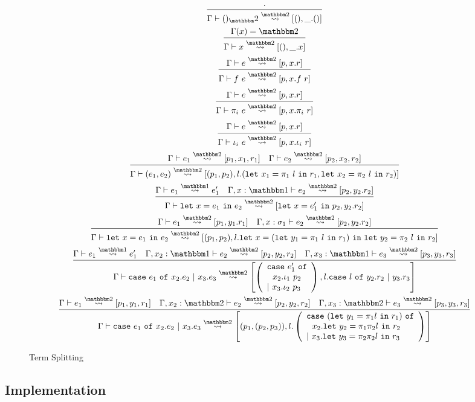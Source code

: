 \documentclass[11pt]{article}
\newcommand {\bbone} {\mathbbm 1}
\newcommand {\bbtwo} {\mathbbm 2}
\newcommand {\letin} [3] {{\tt let}~{#1} = {#2}~{\tt in}~{#3}}
\newcommand {\caseof} [3] {{\tt case}~{#1} ~{\tt of}~{#2}~{\tt |}~{#3}}
\newcommand {\tallcase} [3] {\begin{array}{l} {\tt case}~{#1} ~{\tt of}\\~~{#2}\\{\tt |}~{#3} \end{array}}
\newcommand {\translates} {\overset{\bbone}\rightsquigarrow}
\newcommand {\splits} {\overset{\bbtwo}\rightsquigarrow}
\newcommand {\inferenceSpacing}{\setlength{\jot}{1.8ex}}
\begin{document}
\begin{figure*}
\caption{Term Splitting}
\label{fig:splitting}
\inferenceSpacing
\begin{gather}
\infer {\Gamma \vdash ()_\bbtwo \splits [(),\_.()]}{\cdot} \\
\infer {\Gamma\vdash x \splits [(),\_.x]}{\Gamma(x) = \bbtwo}\\
\infer {\Gamma \vdash f~e \splits [p,x.f~r]}{\Gamma \vdash e \splits [p,x.r]} \\
\infer {\Gamma \vdash \pi_i~e \splits [p,x.\pi_i~r]}{\Gamma \vdash e \splits [p,x.r]} \\
\infer {\Gamma \vdash \iota_i~e \splits [p,x.\iota_i~r]}{\Gamma \vdash e \splits [p,x.r]} \\
\infer {\Gamma \vdash (e_1,e_2) \splits [(p_1,p_2), l.(\letin{x_1}{\pi_1~l}{r_1},\letin{x_2}{\pi_2~l}{r_2})]}{\Gamma \vdash e_1 \splits [p_1,x_1,r_1] & \Gamma \vdash e_2 \splits [p_2,x_2,r_2]} \\
\infer {\Gamma\vdash \letin {x}{e_1}{e_2} \splits [\letin {x}{e'_1}{p_2}, y_2.r_2] }{\Gamma\vdash e_1 \translates e_1' & \Gamma, x:\bbone \vdash e_2 \splits [p_2,y_2.r_2]} \\
\infer { \Gamma\vdash \letin {x}{e_1}{e_2}  \splits [(p_1,p_2), l.\letin {x}{(\letin {y_1}{\pi_1~l}{r_1})}{\letin {y_2}{\pi_2~l}{r_2}}] }{\Gamma\vdash e_1 \splits [p_1,y_1.r_1] & \Gamma, x:\sigma_1 \vdash e_2 \splits [p_2,y_2.r_2]} \\
\infer 
	{\Gamma\vdash \caseof {e_1}{x_2.e_2}{x_3.e_3} \splits \left[\left(\tallcase {e_1'}{x_2.\iota_1~p_2}{x_3.\iota_2~p_3}\right), l.\caseof{l}{y_2.r_2}{y_3.r_3}\right]}
	{\Gamma\vdash e_1 \translates e_1' 
	& \Gamma,x_2:\bbone \vdash e_2 \splits [p_2,y_2,r_2] 
	& \Gamma,x_3:\bbone \vdash e_3 \splits [p_3,y_3,r_3]} \\
\infer 
	{\Gamma\vdash \caseof {e_1}{x_2.e_2}{x_3.e_3} \splits \left[(p_1,(p_2,p_3)), l.
		\left(\tallcase{(\letin {y_1}{\pi_1 l}{r_1})}{x_2.\letin {y_2}{\pi_1\pi_2 l}{r_2}} {x_3.\letin {y_3}{\pi_2\pi_2 l}{r_3}} \right)
	\right] }
	{ \Gamma \vdash e_1 \splits [p_1,y_1,r_1]
	& \Gamma,x_2:\bbtwo \vdash e_2 \splits [p_2,y_2,r_2] 
	& \Gamma,x_3:\bbtwo \vdash e_3 \splits [p_3,y_3,r_3]} 
\end{gather}
\end{figure*}

\subsection{Implementation}
\end{document}
